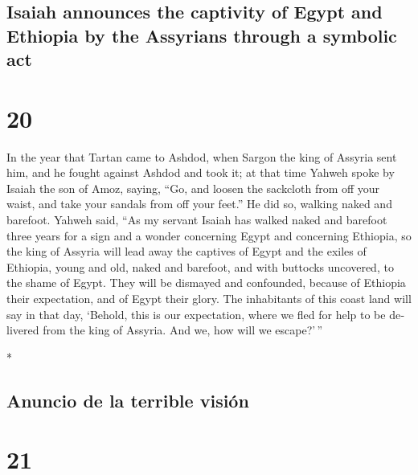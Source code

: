 \begin{paracol}{2}
\switchcolumn
\begin{otherlanguage}{english}

\hypertarget{isaiah-announces-the-captivity-of-egypt-and-ethiopia-by-the-assyrians-through-a-symbolic-act}{%
\subsection{Isaiah announces the captivity of Egypt and Ethiopia by the
Assyrians through a symbolic
act}\label{isaiah-announces-the-captivity-of-egypt-and-ethiopia-by-the-assyrians-through-a-symbolic-act}}

\hypertarget{section-39}{%
\section{20}\label{section-39}}

 In the year that Tartan came to Ashdod, when Sargon the
king of Assyria sent him, and he fought against Ashdod and took it;
 at that time Yahweh spoke by Isaiah the son of Amoz,
saying, ``Go, and loosen the sackcloth from off your waist, and take
your sandals from off your feet.'' He did so, walking naked and
barefoot.  Yahweh said, ``As my servant Isaiah has walked
naked and barefoot three years for a sign and a wonder concerning Egypt
and concerning Ethiopia,  so the king of Assyria will lead
away the captives of Egypt and the exiles of Ethiopia, young and old,
naked and barefoot, and with buttocks uncovered, to the shame of Egypt.
 They will be dismayed and confounded, because of Ethiopia
their expectation, and of Egypt their glory.  The
inhabitants of this coast land will say in that day, `Behold, this is
our expectation, where we fled for help to be delivered from the king of
Assyria. And we, how will we escape?'\,''

\end{otherlanguage}

\switchcolumn[0]*

\hypertarget{anuncio-de-la-terrible-visiuxf3n}{%
\subsection{Anuncio de la terrible
visión}\label{anuncio-de-la-terrible-visiuxf3n}}

\hypertarget{section-40}{%
\section{21}\label{section-40}}


\end{paracol}
